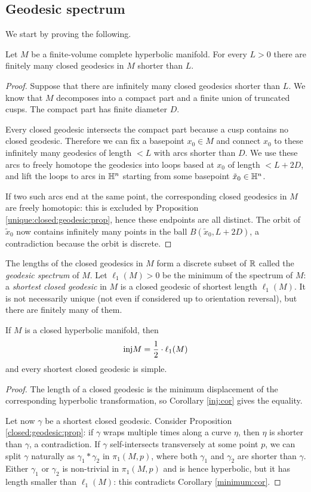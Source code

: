 \subsection{Geodesic spectrum} \label{geodesic:spectrum:subsection}
We start by proving the following.
\begin{prop} Let $M$ be a finite-volume complete hyperbolic manifold. For every $L>0$ there are finitely many closed geodesics in $M$ shorter than $L$.
\end{prop}
\begin{proof}
Suppose that there are infinitely many closed geodesics shorter than $L$. We know that $M$ decomposes into a compact part and a finite union of truncated cusps. The compact part has finite diameter $D$. 

Every closed geodesic intersects the compact part because a cusp contains no closed geodesic. Therefore we can fix a basepoint $x_0\in M$ and connect $x_0$ to these infinitely many geodesics of length $<L$ with arcs shorter than $D$. We use these arcs to freely homotope the geodesics into loops based at $x_0$ of length $<L+2D$, and lift the loops to arcs in $\mathbb{H}^n$ starting from some basepoint $\tilde{x}_0\in \mathbb{H}^n$.

If two such arcs end at the same point, the corresponding closed geodesics in $M$ are freely homotopic: this is excluded by Proposition \ref{unique:closed:geodesic:prop}, hence these endpoints are all distinct. The orbit of $\tilde{x}_0$ now contains infinitely many points in the ball $B(\tilde{x}_0, L+2D)$, a contradiction because the orbit is discrete.
\end{proof}

The lengths of the closed geodesics in $M$ form a discrete subset of $\mathbb{R}$ called the \emph{geodesic spectrum} of $M$. Let $\ell_1(M)>0$ be the minimum of the spectrum of $M$: a \emph{shortest closed geodesic} in $M$ is a closed geodesic of shortest length $\ell_1(M)$. It is not necessarily unique (not even if considered up to orientation reversal), but there are finitely many of them.

\begin{prop}
If $M$ is a closed hyperbolic manifold, then 
$${\rm inj} M = \frac 12 \cdot \ell_1(M)$$
and every shortest closed geodesic is simple.
\end{prop}
\begin{proof}
The length of a closed geodesic is the minimum displacement of the corresponding hyperbolic transformation, so Corollary \ref{inj:cor} gives the equality.

Let now $\gamma$ be a shortest closed geodesic. Consider Proposition \ref{closed:geodesic:prop}:
if $\gamma$ wraps multiple times along a curve $\eta$, then $\eta$ is shorter than $\gamma$, a contradiction. If $\gamma$ self-intersects transversely at some point $p$, we can split $\gamma$ naturally as $\gamma_1*\gamma_2$ in $\pi_1(M,p)$, where both $\gamma_1$ and $\gamma_2$ are shorter than $\gamma$. Either $\gamma_1$ or $\gamma_2$ is non-trivial in $\pi_1(M,p)$ and is hence hyperbolic, but it has length smaller than $\ell_1(M)$: this contradicts Corollary \ref{minimum:cor}.
\end{proof}

